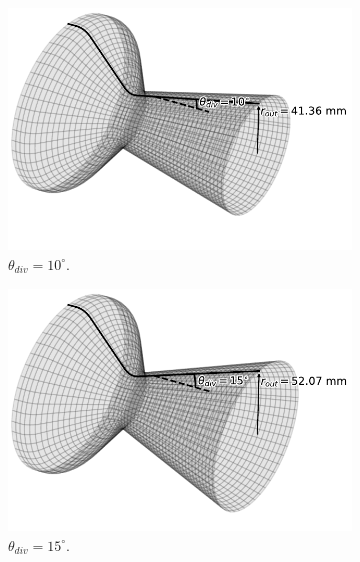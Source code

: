 \begin{figure}[t]
    \centering
    \begin{subfigure}{0.3\textwidth}
        \centering
        \includegraphics[width=\linewidth]{Figuras/geometry_figures/nozzle_10.pdf}  
        \caption{$\theta_{div}=10^{\circ}$.\label{fig:nozzle_10}}
    \end{subfigure}
    \begin{subfigure}{0.3\textwidth}
        \centering
        \includegraphics[width=\linewidth]{Figuras/geometry_figures/nozzle_15.pdf}  
        \caption{$\theta_{div}=15^{\circ}$.\label{fig:nozzle_15}}
    \end{subfigure}
    \begin{subfigure}{0.3\textwidth}
        \centering

\end{subfigure}
\end{figure}

